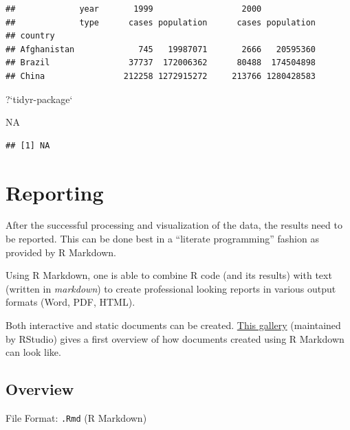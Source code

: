 \documentclass[]{book}
\newenvironment{Shaded}{}{}
\newcommand{\DataTypeTok}[1]{#1}
\newcommand{\NormalTok}[1]{#1}
\newcommand{\OtherTok}[1]{\textcolor[rgb]{1.00,0.25,0.00}{#1}}
\newcommand{\StringTok}[1]{\textcolor[rgb]{0.00,0.50,0.50}{#1}}
\begin{document}
\begin{verbatim}
##             year       1999                  2000           
##             type      cases population      cases population
## country                                                     
## Afghanistan             745   19987071       2666   20595360
## Brazil                37737  172006362      80488  174504898
## China                212258 1272915272     213766 1280428583
\end{verbatim}

\begin{Shaded}
\begin{Highlighting}[]
\NormalTok{?}\StringTok{`}\DataTypeTok{tidyr-package}\StringTok{`}
\end{Highlighting}
\end{Shaded}

\begin{Shaded}
\begin{Highlighting}[]
\OtherTok{NA}
\end{Highlighting}
\end{Shaded}

\begin{verbatim}
## [1] NA
\end{verbatim}

\hypertarget{reporting}{%
\chapter{Reporting}\label{reporting}}

After the successful processing and visualization of the data, the results need to be reported.
This can be done best in a ``literate programming'' fashion as provided by R Markdown.

Using R Markdown, one is able to combine R code (and its results) with text (written in \emph{markdown}) to create professional looking reports in various output formats (Word, PDF, HTML).

Both interactive and static documents can be created.
\href{https://rmarkdown.rstudio.com/gallery.html}{This gallery} (maintained by RStudio) gives a first overview of how documents created using R Markdown can look like.

\hypertarget{overview}{%
\section{Overview}\label{overview}}

File Format: \texttt{.Rmd} (R Markdown)
\end{document}
